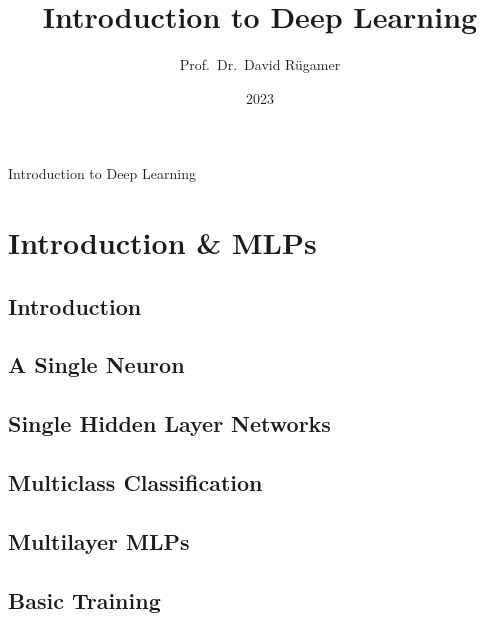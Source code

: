 \documentclass[13pt,compress]{beamer}
\title{Introduction to Deep Learning}
\author{Prof.~Dr.~David R\"ugamer}
\institute{LMU Munich, MCML}
\date{2023}
\begin{document}



\begin{frame}[plain]
  \titlepage
\end{frame}
\begin{frame}[plain]{Introduction to Deep Learning}
\tableofcontents[sectionstyle=show/show, subsectionstyle=hide/hide]
\end{frame}
\section{Introduction \& MLPs}
\subsection{Introduction}

\subsection {A Single Neuron}

\subsection{Single Hidden Layer Networks}

\subsection{Multiclass Classification}

\subsection{Multilayer MLPs}

\subsection{Basic Training}





\end{document}
